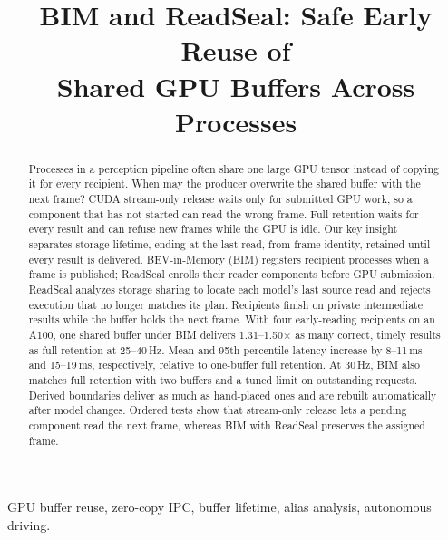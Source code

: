 \documentclass[conference]{IEEEtran}
\newcommand{\ms}{\,ms}
\newcommand{\Hz}{\,Hz}
\begin{document}
\title{BIM and ReadSeal: Safe Early Reuse of\\ Shared GPU Buffers Across Processes}

\author{
}

\maketitle

\begin{abstract}
Processes in a perception pipeline often share one large GPU tensor instead of copying it for every recipient. When may the producer overwrite the shared buffer with the next frame? CUDA stream-only release waits only for submitted GPU work, so a component that has not started can read the wrong frame. Full retention waits for every result and can refuse new frames while the GPU is idle. Our key insight separates storage lifetime, ending at the last read, from frame identity, retained until every result is delivered. BEV-in-Memory (BIM) registers recipient processes when a frame is published; ReadSeal enrolls their reader components before GPU submission. ReadSeal analyzes storage sharing to locate each model's last source read and rejects execution that no longer matches its plan. Recipients finish on private intermediate results while the buffer holds the next frame. With four early-reading recipients on an A100, one shared buffer under BIM delivers 1.31--1.50$\times$ as many correct, timely results as full retention at 25--40\Hz. Mean and 95th-percentile latency increase by 8--11\ms{} and 15--19\ms, respectively, relative to one-buffer full retention. At 30\Hz, BIM also matches full retention with two buffers and a tuned limit on outstanding requests. Derived boundaries deliver as much as hand-placed ones and are rebuilt automatically after model changes. Ordered tests show that stream-only release lets a pending component read the next frame, whereas BIM with ReadSeal preserves the assigned frame.
\end{abstract}

\begin{IEEEkeywords}
GPU buffer reuse, zero-copy IPC, buffer lifetime, alias analysis, autonomous driving.
\end{IEEEkeywords}
\end{document}
